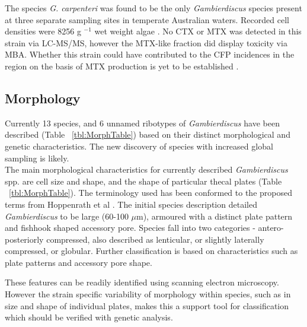 \documentclass[12pt]{article}
\begin{document}
The species \emph{G. carpenteri} was found to be the only \emph{Gambierdiscus} species present at three separate sampling sites in temperate Australian waters. Recorded cell densities were 8256 g $^{-1}$ wet weight algae \cite{kohli2014high}. No CTX or MTX was detected in this strain via LC-MS/MS, however the MTX-like fraction did display toxicity via MBA. Whether this strain could have contributed to the CFP incidences in the region on the basis of MTX production is yet to be established  \cite{kohli2014high}. 

\subsection{Morphology}

Currently 13 species, and 6 unnamed ribotypes of \emph{Gambierdiscus} have been described (Table ~\ref{tbl:MorphTable}) based on their distinct morphological and genetic characteristics. The new discovery of species with increased global sampling is likely. \\

The main morphological characteristics for currently described \emph{Gambierdiscus} spp. are cell size and shape, and the shape of particular thecal plates (Table ~\ref{tbl:MorphTable}). The terminology used has been conformed to the proposed terms from Hoppenrath et al \cite{hoppenrath2013taxonomy}. The initial species description detailed \emph{Gambierdiscus} to be large (60-100 $\mu$m), armoured with a distinct plate pattern and fishhook shaped accessory pore. Species fall into two categories - antero-posteriorly compressed, also described as lenticular, or slightly laterally compressed, or globular. Further classification is based on characteristics such as plate patterns and accessory pore shape. %

These features can be readily identified using scanning electron microscopy. However the strain specific variability of morphology within species, such as in size and shape of individual plates, makes this a support tool for classification which should be verified with genetic analysis. \\
\end{document}
